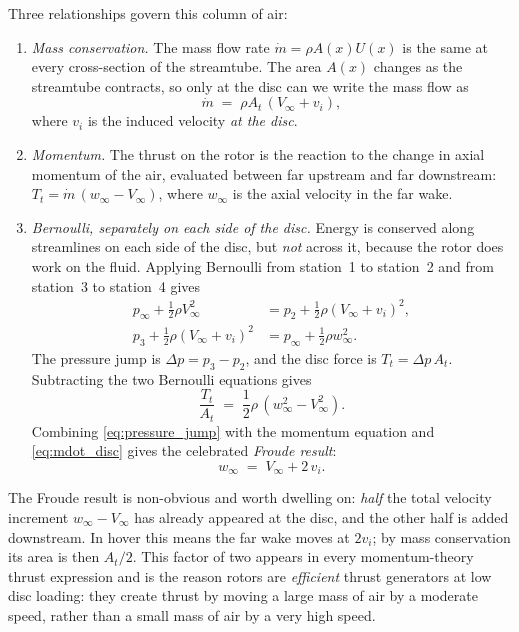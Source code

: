 \documentclass[11pt,a4paper]{article}
\newcommand{\At}{A_t}
\newcommand{\Tt}{T_t}
\newcommand{\vi}{v_i}
\begin{document}
Three relationships govern this column of air:

\begin{enumerate}[leftmargin=*,itemsep=2pt,topsep=2pt]
\item \emph{Mass conservation.} The mass flow rate
      \(\dot{m}=\rho A(x)U(x)\) is the same at every cross-section of the
      streamtube. The area \(A(x)\) changes as the streamtube contracts,
      so only at the disc can we write the mass flow as
      \begin{equation}
      \dot{m} \;=\; \rho\At\,(V_\infty+\vi),
      \label{eq:mdot_disc}
      \end{equation}
      where \(\vi\) is the induced velocity \emph{at the disc}.
\item \emph{Momentum.} The thrust on the rotor is the reaction to the
      change in axial momentum of the air, evaluated between far upstream
      and far downstream:
      \(\Tt = \dot{m}\,(w_\infty - V_\infty)\), where \(w_\infty\) is
      the axial velocity in the far wake.
\item \emph{Bernoulli, separately on each side of the disc.} Energy is
      conserved along streamlines on each side of the disc, but \emph{not}
      across it, because the rotor does work on the fluid. Applying
      Bernoulli from station~1 to station~2 and from station~3 to
      station~4 gives
      \begin{align}
      p_\infty + \tfrac{1}{2}\rho V_\infty^2
        &= p_2 + \tfrac{1}{2}\rho (V_\infty+\vi)^2,\\
      p_3 + \tfrac{1}{2}\rho (V_\infty+\vi)^2
        &= p_\infty + \tfrac{1}{2}\rho w_\infty^2.
      \end{align}
      The pressure jump is \(\Delta p=p_3-p_2\), and the disc force is
      \(\Tt=\Delta p\,\At\). Subtracting the two Bernoulli equations gives
      \begin{equation}
      \frac{\Tt}{\At}
      \;=\; \frac{1}{2}\rho\,(w_\infty^2 - V_\infty^2).
      \label{eq:pressure_jump}
      \end{equation}
      Combining \eqref{eq:pressure_jump} with the momentum equation and
      \eqref{eq:mdot_disc} gives the celebrated \emph{Froude result}:
      \begin{equation}
      w_\infty \;=\; V_\infty + 2\,\vi.
      \label{eq:froude}
      \end{equation}
\end{enumerate}

\noindent
The Froude result is non-obvious and worth dwelling on: \emph{half} the
total velocity increment \(w_\infty-V_\infty\) has already appeared at
the disc, and the other half is added downstream. In hover this means the
far wake moves at \(2\vi\); by mass conservation its area is then
\(\At/2\). This factor of two appears in every momentum-theory thrust
expression and is the reason rotors are \emph{efficient} thrust generators
at low disc loading: they create thrust by moving a large mass of air by a
moderate speed, rather than a small mass of air by a very high speed.
\end{document}
